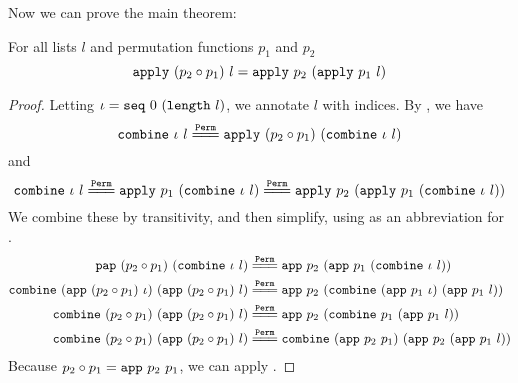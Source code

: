 \documentclass[sigplan,10pt,anonymous,review]{thesis}
\begin{document}
Now we can prove the main theorem:
\begin{theorem}
  For all lists $l$ and permutation functions $p_1$ and $p_2$
  \begin{equation*}
      \texttt{apply}~(p_2 \circ p_1)~l = \texttt{apply}~p_2~(\texttt{apply}~p_1~l)
  \end{equation*}
\end{theorem}
\begin{proof}
  Letting $\iota = \texttt{seq}~0~(\texttt{length}~l)$, we annotate $l$ with
  indices. By , we have
  \begin{equation*}
     \var{combine}~\iota~l \eqperm \var{apply}~(p_2 \comp p_1)~(\var{combine}~\iota~l)
  \end{equation*}
  and
  \begin{equation*}
    \var{combine}~\iota~l
    \eqperm
    \var{apply}~p_1~(\var{combine}~\iota~l)
    \eqperm
    \var{apply}~p_2~(\var{apply}~p_1~(\var{combine}~\iota~l))
  \end{equation*}
  We combine these by transitivity, and then simplify, using 
  as an abbreviation for .
  \begin{align*}
    \var{pap}~(p_2 \comp p_1)~(\var{combine}~\iota~l)
    &\eqperm
    \var{app}~p_2~(\var{app}~p_1~(\var{combine}~\iota~l)) \\
    \var{combine}~(\var{app}~(p_2 \comp p_1)~\iota)~(\var{app}~(p_2 \comp p_1)~l)
    &\eqperm
    \var{app}~p_2~(\var{combine}~(\var{app}~p_1~\iota)~(\var{app}~p_1~l)) \\
    \var{combine}~(p_2 \comp p_1)~(\var{app}~(p_2 \comp p_1)~l)
    &\eqperm
    \var{app}~p_2~(\var{combine}~p_1~(\var{app}~p_1~l)) \\
    \var{combine}~(p_2 \comp p_1)~(\var{app}~(p_2 \comp p_1)~l)
    &\eqperm
    \var{combine}~(\var{app}~p_2~p_1)~(\var{app}~p_2~(\var{app}~p_1~l))
  \end{align*}
  Because $p_2 \circ p_1 = \texttt{app}~p_2~p_1$, we can apply
  .
\end{proof}
\end{document}
